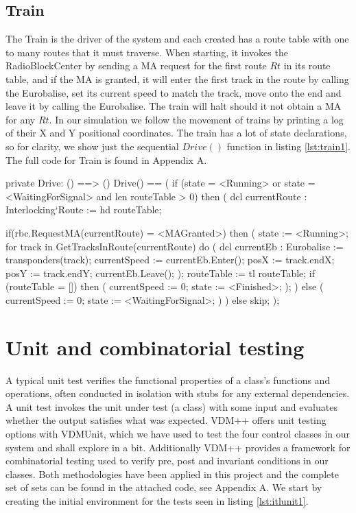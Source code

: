 \documentclass[preprint,12pt]{elsarticle}
\begin{document}
\subsection{Train}

The Train is the driver of the system and each created has a route table with one to many routes that it must traverse. When starting, it invokes the RadioBlockCenter by sending a MA request for the first route $Rt$ in its route table, and if the MA is granted, it will enter the first track in the route by calling the Eurobalise, set its current speed to match the track, move onto the end and leave it by calling the Eurobalise. The train will halt should it not obtain a MA for any $Rt$. In our simulation we follow the movement of trains by printing a log of their X and Y positional coordinates. The train has a lot of state declarations, so for clarity, we show just the sequential $Drive()$ function in listing \ref{lst:train1}. The full code for Train is found in Appendix A.

\begin{vdmsl}[label=lst:train1,caption={Drive() moves the train along a sequence of routes, requests MA for each route and obeys track speed limits.}]
	private Drive: () ==> ()
	Drive() ==
	(
	if (state = <Running> or state = <WaitingForSignal>
		and len routeTable > 0) then (
			dcl currentRoute : Interlocking`Route := hd routeTable;
			
			if(rbc.RequestMA(currentRoute) = <MAGranted>)
			then (
				state := <Running>;
				for track in GetTracksInRoute(currentRoute) do (
					dcl currentEb : Eurobalise := transponders(track);
					currentSpeed := currentEb.Enter();
					posX := track.endX;
					posY := track.endY;
					currentEb.Leave();
				);
			routeTable := tl routeTable;
			if (routeTable = []) then (
				currentSpeed := 0;
				state := <Finished>;
			);
		) else (
		currentSpeed := 0;
		state := <WaitingForSignal>;
		)
	) else skip;
	);
\end{vdmsl}

\section{Unit and combinatorial testing}

A typical unit test verifies the functional properties of a class's functions and operations, often conducted in isolation with stubs for any external dependencies. A unit test invokes the unit under test (a class) with some input and evaluates whether the output satisfies what was expected. VDM++ offers unit testing options with VDMUnit, which we have used to test the four control classes in our system and shall explore in a bit. Additionally VDM++ provides a framework for combinatorial testing used to verify pre, post and invariant conditions in our classes. Both methodologies have been applied in this project and the complete set of sets can be found in the attached code, see Appendix A. We start by creating the initial environment for the tests seen in listing \ref{lst:itlunit1}.
\end{document}
